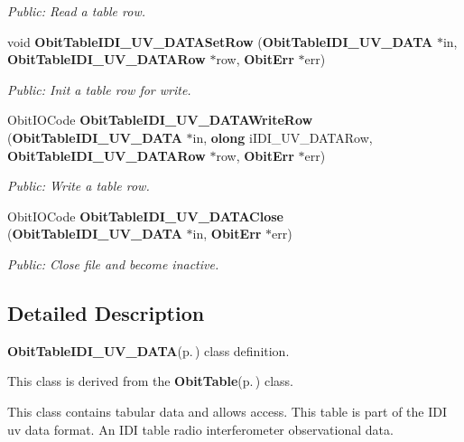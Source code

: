 \begin{CompactItemize}
\begin{CompactList}\small\item\em Public: Read a table row. \item\end{CompactList}\item 
void {\bf Obit\-Table\-IDI\_\-UV\_\-DATASet\-Row} ({\bf Obit\-Table\-IDI\_\-UV\_\-DATA} $\ast$in, {\bf Obit\-Table\-IDI\_\-UV\_\-DATARow} $\ast$row, {\bf Obit\-Err} $\ast$err)
\begin{CompactList}\small\item\em Public: Init a table row for write. \item\end{CompactList}\item 
Obit\-IOCode {\bf Obit\-Table\-IDI\_\-UV\_\-DATAWrite\-Row} ({\bf Obit\-Table\-IDI\_\-UV\_\-DATA} $\ast$in, {\bf olong} i\-IDI\_\-UV\_\-DATARow, {\bf Obit\-Table\-IDI\_\-UV\_\-DATARow} $\ast$row, {\bf Obit\-Err} $\ast$err)
\begin{CompactList}\small\item\em Public: Write a table row. \item\end{CompactList}\item 
Obit\-IOCode {\bf Obit\-Table\-IDI\_\-UV\_\-DATAClose} ({\bf Obit\-Table\-IDI\_\-UV\_\-DATA} $\ast$in, {\bf Obit\-Err} $\ast$err)
\begin{CompactList}\small\item\em Public: Close file and become inactive. \item\end{CompactList}\end{CompactItemize}


\subsection{Detailed Description}
{\bf Obit\-Table\-IDI\_\-UV\_\-DATA}{\rm (p.\,\pageref{structObitTableIDI__UV__DATA})} class definition. 

This class is derived from the {\bf Obit\-Table}{\rm (p.\,\pageref{structObitTable})} class.

This class contains tabular data and allows access. This table is part of the IDI uv data format. An IDI table radio interferometer observational data.

